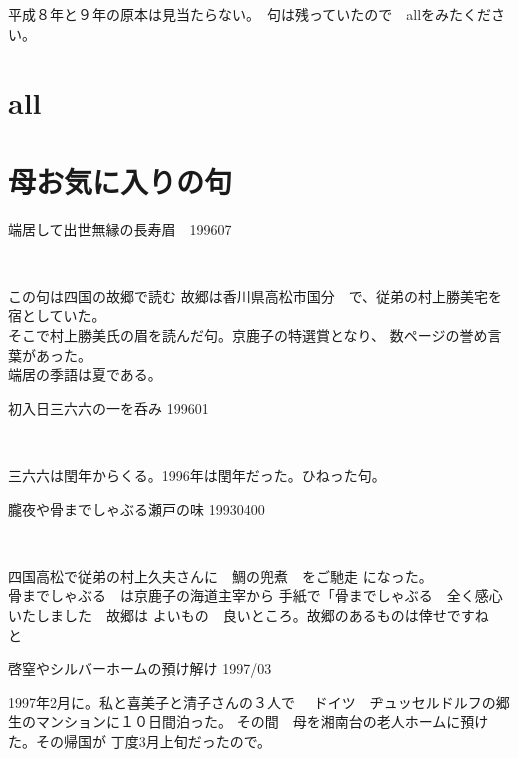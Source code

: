 \documentclass[b5paper]{tbook}
\begin{document}


\vspace{0.6cm}

平成８年と９年の原本は見当たらない。　句は残っていたので　allをみたください。

\chapter{all}

\chapter{母お気に入りの句}%
\begin{shiika}端居して出世無縁の長寿眉　\hfill{199607}　\end{shiika}　　　

この句は四国の故郷で読む
故郷は香川県高松市国分　で、従弟の村上勝美宅を宿としていた。
\\そこで村上勝美氏の眉を読んだ句。京鹿子の特選賞となり、
数ページの誉め言葉があった。\\端居の季語は夏である。

\vspace{5mm}
\begin{shiika}初入日三六六の一を呑み 199601　\end{shiika}　

三六六は閏年からくる。1996年は閏年だった。ひねった句。
\vspace{5mm}
\begin{shiika}朧夜や骨までしゃぶる瀬戸の味 19930400\end{shiika}　

四国高松で従弟の村上久夫さんに　鯛の兜煮　をご馳走
になった。
\\骨までしゃぶる　は京鹿子の海道主宰から
手紙で「骨までしゃぶる　全く感心いたしました　故郷は
よいもの　良いところ。故郷のあるものは倖せですね　と
\vspace{5mm}
\begin{shiika}啓窒やシルバーホームの預け解け 1997/03\end{shiika}

1997年2月に。私と喜美子と清子さんの３人で　
ドイツ　ヂュッセルドルフの郷生のマンションに１０日間泊った。
その間　母を湘南台の老人ホームに預けた。その帰国が
丁度3月上旬だったので。
\vspace{5mm}
\end{document}
